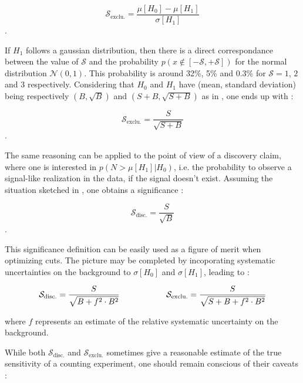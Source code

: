     $$ \mathcal{S}_\text{exclu.} = \frac{\mu[H_0] - \mu[H_1]}{\sigma[H_1]}$$.

    If $H_1$ follows a gaussian distribution, then there is a direct correspondance
    between the value of $\mathcal{S}$ and the probability $p(x \notin [-\mathcal{S},+\mathcal{S}])$
    for the normal distribution $\mathcal{N(0,1)}$. This probability is around 32\%,
    5\% and 0.3\% for $\mathcal{S} = 1$, $2$ and $3$ respectively.
    Considering that $H_0$ and $H_1$ have (mean, standard deviation) being respectively
    $(B,\sqrt{B})$ and $(S+B,\sqrt{S+B})$ as in , one ends up
    with :

    $$ \mathcal{S}_\text{exclu.} = \frac{S}{\sqrt{S+B}}$$.

    The same reasoning can be applied to the point of view of a discovery claim, where
    one is interested in $p(N > \mu[H_1]|H_0)$, i.e. the probability to observe a
    signal-like realization in the data, if the signal doesn't exist. Assuming the situation
    sketched in , one obtains a significance :

    $$ \mathcal{S}_\text{disc.} = \frac{S}{\sqrt{B}}$$.

    This significance definition can be easily used as a figure of merit when optimizing
    cuts. The picture may be completed by incoporating systematic uncertainties on the
    background to $\sigma[H_0]$ and $\sigma[H_1]$, leading to :

    \begin{equation}
       \mathcal{S}_\text{disc.} = \frac{S}{\sqrt{B+f^2 \cdot B^2}}
       \hspace*{2cm}
       \mathcal{S}_\text{exclu.} = \frac{S}{\sqrt{S+B+f^2 \cdot B^2}}
       \label{FoM}
   \end{equation}

    where $f$ represents an estimate of the relative systematic uncertainty on the background.

    While both $\mathcal{S}_\text{disc.}$ and $\mathcal{S}_\text{exclu.}$ sometimes give a reasonable estimate of the true
    sensitivity of a counting experiment, one should remain conscious of their caveats \cite{Punzi} :

